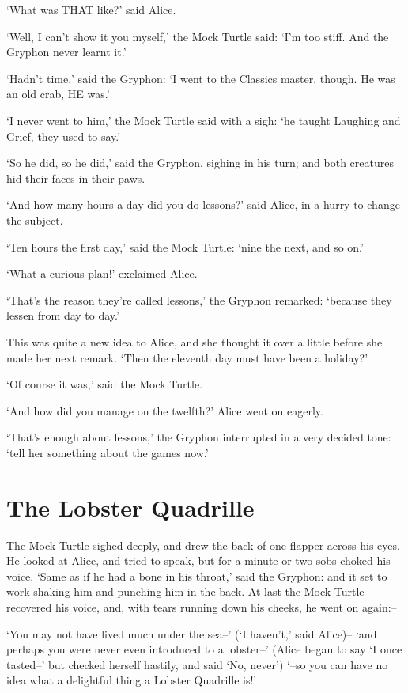 \documentclass[12pt]{book}
\begin{document}
  `What was THAT like?' said Alice.

  `Well, I can't show it you myself,' the Mock Turtle said:  `I'm
too stiff.  And the Gryphon never learnt it.'

  `Hadn't time,' said the Gryphon:  `I went to the Classics
master, though.  He was an old crab, HE was.'

  `I never went to him,' the Mock Turtle said with a sigh:  `he
taught Laughing and Grief, they used to say.'

  `So he did, so he did,' said the Gryphon, sighing in his turn;
and both creatures hid their faces in their paws.

  `And how many hours a day did you do lessons?' said Alice, in a
hurry to change the subject.

  `Ten hours the first day,' said the Mock Turtle: `nine the
next, and so on.'

  `What a curious plan!' exclaimed Alice.

  `That's the reason they're called lessons,' the Gryphon
remarked:  `because they lessen from day to day.'

  This was quite a new idea to Alice, and she thought it over a
little before she made her next remark.  `Then the eleventh day
must have been a holiday?'

  `Of course it was,' said the Mock Turtle.

  `And how did you manage on the twelfth?' Alice went on eagerly.

  `That's enough about lessons,' the Gryphon interrupted in a
very decided tone:  `tell her something about the games now.'

\chapter{The Lobster Quadrille}

  The Mock Turtle sighed deeply, and drew the back of one flapper
across his eyes.  He looked at Alice, and tried to speak, but for
a minute or two sobs choked his voice.  `Same as if he had a bone
in his throat,' said the Gryphon:  and it set to work shaking him
and punching him in the back.  At last the Mock Turtle recovered
his voice, and, with tears running down his cheeks, he went on
again:--

  `You may not have lived much under the sea--' (`I haven't,' said Alice)--
`and perhaps you were never even introduced to a lobster--'
(Alice began to say `I once tasted--' but checked herself hastily,
and said `No, never') `--so you can have no idea what a delightful
thing a Lobster Quadrille is!'
\end{document}
